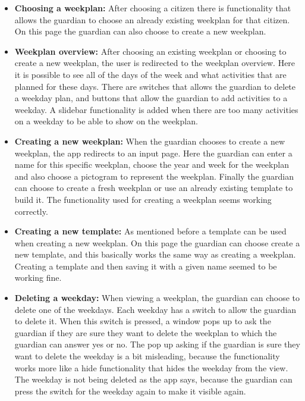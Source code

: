 \begin{itemize}
    \item \textbf{Choosing a weekplan:} After choosing a citizen there is functionality that allows the guardian to choose an already existing weekplan for that citizen. 
    On this page the guardian can also choose to create a new weekplan.
    \\
    \item \textbf{Weekplan overview:} After choosing an existing weekplan or choosing to create a new weekplan, the user is redirected to the weekplan overview. 
    Here it is possible to see all of the days of the week and what activities that are planned for these days. 
    There are switches that allows the guardian to delete a weekday plan, and buttons that allow the guardian to add activities to a weekday. 
    A slidebar functionality is added when there are too many activities on a weekday to be able to show on the weekplan.
    \\
    \item \textbf{Creating a new weekplan:} When the guardian chooses to create a new weekplan, the app redirects to an input page. 
    Here the guardian can enter a name for this specific weekplan, choose the year and week for the weekplan and also choose a pictogram to represent the weekplan. 
    Finally the guardian can choose to create a fresh weekplan or use an already existing template to build it. The functionality used for creating a weekplan seems working correctly.
    \\
    \item \textbf{Creating a new template:} As mentioned before a template can be used when creating a new weekplan. 
    On this page the guardian can choose create a new template, and this basically works the same way as creating a weekplan. 
    Creating a template and then saving it with a given name seemed to be working fine.
    \\
    \item \textbf{Deleting a weekday:} When viewing a weekplan, the guardian can choose to delete one of the weekdays. Each weekday has a switch to allow the guardian to delete it.
    When this switch is pressed, a window pops up to ask the guardian if they are sure they want to delete the weekplan to which the guardian can answer yes or no. 
    The pop up asking if the guardian is sure they want to delete the weekday is a bit misleading, because the functionality works more like a hide functionality that hides the weekday from the view. 
    The weekday is not being deleted as the app says, because the guardian can press the switch for the weekday again to make it visible again.

\end{itemize}
